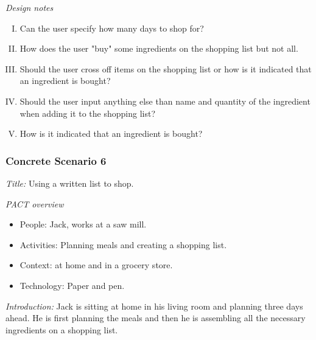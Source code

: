 \emph{Design notes}

\begin{enumerate} [(I)]
\item Can the user specify how many days to shop for?
\item How does the user "buy" some ingredients on the shopping list but not all.
\item Should the user cross off items on the shopping list or how is it indicated that an ingredient is bought?
\item Should the user input anything else than name and quantity of the ingredient when adding it to the shopping list?
\item How is it indicated that an ingredient is bought?
\end{enumerate}

\subsubsection{Concrete Scenario 6} \label{ConcreteScenario6}

\emph{Title:} Using a written list to shop.

\emph{PACT overview}
\begin{itemize}
\item People: Jack, works at a saw mill. 
\item Activities: Planning meals and creating a shopping list.
\item Context: at home and in a grocery store.
\item Technology: Paper and pen.
\end{itemize}

\emph{Introduction:} Jack is sitting at home in his living room and planning three days ahead. He is first planning the meals and then he is assembling all the necessary ingredients on a shopping list. 


